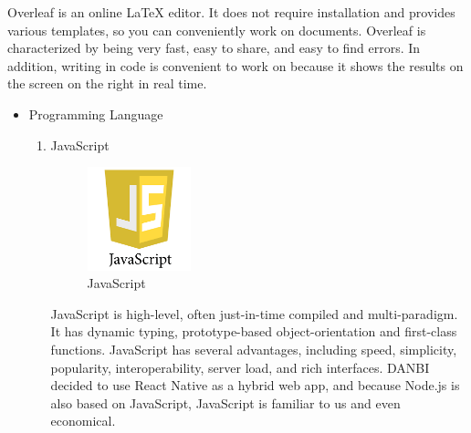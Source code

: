 \documentclass[conference]{IEEEtran}
\begin{document}
\begin{itemize}
\begin{enumerate}
Overleaf is an online LaTeX editor. It does not require installation and provides various templates, so you can conveniently work on documents. Overleaf is characterized by being very fast, easy to share, and easy to find errors. In addition, writing in code is convenient to work on because it shows the results on the screen on the right in real time.

\end{enumerate}
\end{itemize}
\vspace{0.5mm}
\begin{itemize}
\item Programming Language
\setlength{\parindent}{2ex}

\begin{enumerate}
\item JavaScript
\par \begin{figure}[h!]
\includegraphics[width=3cm]{image/JavaScript.png}
\centering
\caption{JavaScript}
\end{figure}
\setlength{\parindent}{2ex}
\setlength{\parskip}{0.5em}
JavaScript is high-level, often just-in-time compiled and multi-paradigm. It has dynamic typing, prototype-based object-orientation and first-class functions. JavaScript has several advantages, including speed, simplicity, popularity, interoperability, server load, and rich interfaces. DANBI decided to use React Native as a hybrid web app, and because Node.js is also based on JavaScript, JavaScript is familiar to us and even economical.
\end{enumerate}
\end{itemize}
\vspace{0.5mm}
\end{document}
